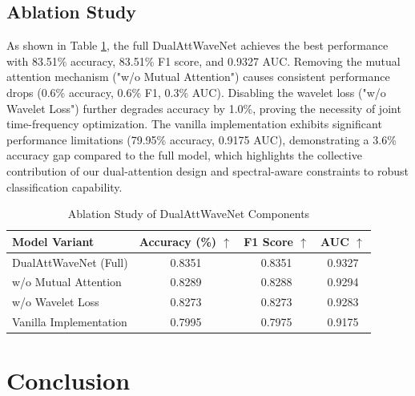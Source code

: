 \documentclass[conference]{IEEEtran}
\begin{document}
\subsection{Ablation Study}

As shown in Table \ref{tab:ablation}, the full DualAttWaveNet achieves the best performance with 83.51\% accuracy, 83.51\% F1 score, and 0.9327 AUC. Removing the mutual attention mechanism ("w/o Mutual Attention") causes consistent performance drops (0.6\% accuracy, 0.6\% F1, 0.3\% AUC). Disabling the wavelet loss ("w/o Wavelet Loss") further degrades accuracy by 1.0\%, proving the necessity of joint time-frequency optimization. The vanilla implementation exhibits significant performance limitations (79.95\% accuracy, 0.9175 AUC), demonstrating a 3.6\% accuracy gap compared to the full model, which highlights the collective contribution of our dual-attention design and spectral-aware constraints to robust classification capability.

\begin{table}[htbp]
    \caption{Ablation Study of DualAttWaveNet Components}
    \label{tab:ablation}
    \centering

    \begin{tabular}{lccc}
        \toprule
        \textbf{Model Variant} & \textbf{Accuracy (\%)} $\uparrow$ & \textbf{F1 Score} $\uparrow$ & \textbf{AUC} $\uparrow$ \\
        \midrule
        DualAttWaveNet (Full)  & 0.8351                            & 0.8351                       & 0.9327                  \\
        \cmidrule{1-4}
        w/o Mutual Attention   & 0.8289                            & 0.8288                       & 0.9294                  \\
        w/o Wavelet Loss       & 0.8273                            & 0.8273                       & 0.9283                  \\
        Vanilla Implementation & 0.7995                            & 0.7975                       & 0.9175                  \\
        \bottomrule
    \end{tabular}

\end{table}

\section{Conclusion}
\label{sec:conclusion}
\end{document}
